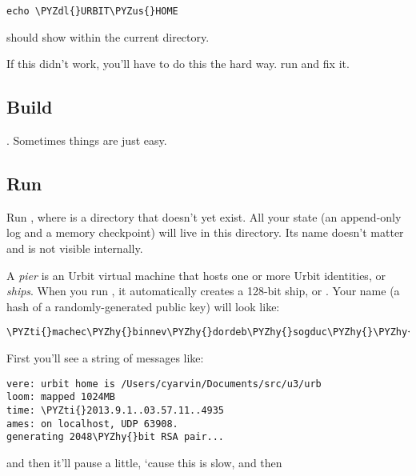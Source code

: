 \begin{framed_shaded}
\begin{Verbatim}[fontsize=\relsize{-2.5},fontseries=b,commandchars=\\\{\}]
echo \PYZdl{}URBIT\PYZus{}HOME
\end{Verbatim}
\end{framed_shaded}
should show  within the current directory.

If this didn't work, you'll have to do this the hard way. run  and fix it.

\subsection{Build}

.  Sometimes things are just easy.

\subsection{Run}

Run , where  is a directory that doesn't yet exist.
All your state (an append-only log and a memory checkpoint) will live in this
directory.  Its name doesn't matter and is not visible internally.

A \emph{pier} is an Urbit virtual machine that hosts one or more Urbit identities,
or \emph{ships}.  When you run , it automatically creates a 128-bit ship,
or .  Your name (a hash of a randomly-generated public key) will
look like:

\begin{framed_shaded}
\begin{Verbatim}[fontsize=\relsize{-2.5},fontseries=b,commandchars=\\\{\}]
\PYZti{}machec\PYZhy{}binnev\PYZhy{}dordeb\PYZhy{}sogduc\PYZhy{}\PYZhy{}dosmul\PYZhy{}sarrum\PYZhy{}faplec\PYZhy{}nidted
\end{Verbatim}
\end{framed_shaded}
First you'll see a string of messages like:

\begin{framed_shaded}
\begin{Verbatim}[fontsize=\relsize{-2.5},fontseries=b,commandchars=\\\{\}]
vere: urbit home is /Users/cyarvin/Documents/src/u3/urb
loom: mapped 1024MB
time: \PYZti{}2013.9.1..03.57.11..4935
ames: on localhost, UDP 63908.
generating 2048\PYZhy{}bit RSA pair...
\end{Verbatim}
\end{framed_shaded}
and then it'll pause a little, `cause this is slow, and then

